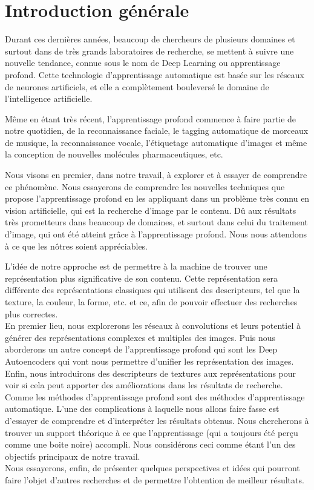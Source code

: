 
\chapter*{Introduction générale} %

	Durant ces dernières années, beaucoup de chercheurs de plusieurs domaines et surtout dans de très grands laboratoires de recherche, se mettent à suivre une nouvelle tendance, connue sous le nom de Deep Learning ou apprentissage profond. Cette technologie d'apprentissage automatique est basée sur les réseaux de neurones artificiels, et elle a complètement bouleversé le domaine de l'intelligence artificielle.
	
	Même en étant très récent, l'apprentissage profond commence à faire partie de notre quotidien, de la reconnaissance faciale, le tagging automatique de morceaux de musique, la reconnaissance vocale, l'étiquetage automatique d’images et même la conception de nouvelles molécules pharmaceutiques, etc.

	Nous visons en premier, dans notre travail, à explorer et à essayer de comprendre ce phénomène. Nous essayerons de comprendre les nouvelles techniques que propose l'apprentissage profond en les appliquant dans un problème très connu en vision artificielle, qui est la recherche d'image par le contenu. Dû aux résultats très prometteurs dans beaucoup de domaines, et surtout dans celui du traitement d'image, qui ont été atteint grâce à l'apprentissage profond. Nous nous attendons à ce que les nôtres soient appréciables.
	
	L’idée de notre approche est de permettre à la machine de trouver une représentation plus significative de son contenu. Cette représentation sera différente des représentations classiques qui utilisent des descripteurs, tel que la texture, la couleur, la forme, etc. et ce, afin de pouvoir effectuer des recherches plus correctes.\\

	En premier lieu, nous explorerons les réseaux à convolutions et leurs potentiel à générer des représentations complexes et multiples des images. Puis nous aborderons un autre concept de l'apprentissage profond qui sont les Deep Autoencoders qui vont nous permettre d'unifier les représentation des images. Enfin, nous introduirons des descripteurs de textures aux représentations pour voir si cela peut apporter des améliorations dans les résultats de recherche.\\

	Comme les méthodes d’apprentissage profond sont des méthodes d'apprentissage automatique. L'une des complications à laquelle nous allons faire fasse est d'essayer de comprendre et d'interpréter les résultats obtenus. Nous chercherons à trouver un support théorique à ce que l'apprentissage (qui a toujours été perçu comme une boite noire) accompli. Nous considérons ceci comme étant l'un des objectifs principaux de notre travail.\\

Nous essayerons, enfin, de présenter quelques perspectives et idées qui pourront faire l'objet d'autres recherches et de permettre l'obtention de meilleur résultats.
